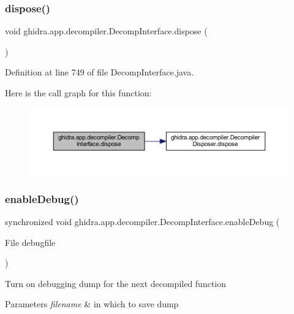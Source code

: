 \subsubsection{\texorpdfstring{dispose()}{dispose()}}
{\footnotesize\ttfamily void ghidra.\+app.\+decompiler.\+Decomp\+Interface.\+dispose (\begin{DoxyParamCaption}{ }\end{DoxyParamCaption})\hspace{0.3cm}{\ttfamily [inline]}}



Definition at line 749 of file Decomp\+Interface.\+java.

Here is the call graph for this function\+:
\nopagebreak
\begin{figure}[H]
\begin{center}
\leavevmode
\includegraphics[width=350pt]{classghidra_1_1app_1_1decompiler_1_1_decomp_interface_a627a3e6485e083dfbb41ffa25b131ad4_cgraph}
\end{center}
\end{figure}
\mbox{\label{classghidra_1_1app_1_1decompiler_1_1_decomp_interface_a255a0680986c6d2c7bd0c674f56f9124}} 
\subsubsection{\texorpdfstring{enableDebug()}{enableDebug()}}
{\footnotesize\ttfamily synchronized void ghidra.\+app.\+decompiler.\+Decomp\+Interface.\+enable\+Debug (\begin{DoxyParamCaption}\item[{File}]{debugfile }\end{DoxyParamCaption})\hspace{0.3cm}{\ttfamily [inline]}}

Turn on debugging dump for the next decompiled function 
\begin{DoxyParams}{Parameters}
{\em filename} & in which to save dump \\
\hline
\end{DoxyParams}



